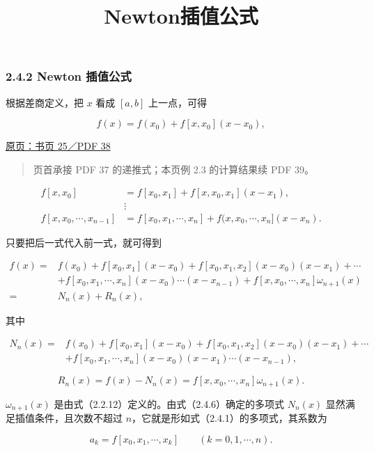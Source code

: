 \documentclass[
  10pt,
  fontset=fandol]{ctexart}
\title{Newton插值公式}
\author{}
\date{}
\begin{document}
\maketitle

\subsubsection{2.4.2 Newton 插值公式}\label{newton-ux63d2ux503cux516cux5f0f}

根据差商定义，把 \(x\) 看成 \([a,b]\) 上一点，可得

\[
f(x)=f(x_0)+f[x,x_0](x-x_0),
\]

\href{../../source-images/pdf-038.jpeg}{原页：书页 25／PDF 38}

\begin{quote}
页首承接 PDF 37 的递推式；本页例 2.3 的计算结果续 PDF 39。
\end{quote}

\[
\begin{aligned}
f[x,x_0]&=f[x_0,x_1]+f[x,x_0,x_1](x-x_1),\\
&\vdots\\
f[x,x_0,\cdots,x_{n-1}]&=f[x_0,x_1,\cdots,x_n]+f(x,x_0,\cdots,x_n](x-x_n).
\end{aligned}
\]

只要把后一式代入前一式，就可得到

\[
\begin{aligned}
f(x)={}&f(x_0)+f[x_0,x_1](x-x_0)+f[x_0,x_1,x_2](x-x_0)(x-x_1)+\cdots\\
&+f[x_0,x_1,\cdots,x_n](x-x_0)\cdots(x-x_{n-1})+f[x,x_0,\cdots,x_n]\omega_{n+1}(x)\\
={}&N_n(x)+R_n(x),
\end{aligned}
\]

其中

\[
\begin{aligned}
N_n(x)={}&f(x_0)+f[x_0,x_1](x-x_0)+f[x_0,x_1,x_2](x-x_0)(x-x_1)+\cdots\\
&+f[x_0,x_1,\cdots,x_n](x-x_0)(x-x_1)\cdots(x-x_{n-1}),
\end{aligned}
\tag{2.4.6}
\]

\[
R_n(x)=f(x)-N_n(x)=f[x,x_0,\cdots,x_n]\omega_{n+1}(x).
\tag{2.4.7}
\]

\(\omega_{n+1}(x)\) 是由式（2.2.12）定义的。由式（2.4.6）确定的多项式 \(N_n(x)\) 显然满足插值条件，且次数不超过 \(n\)，它就是形如式（2.4.1）的多项式，其系数为

\[
a_k=f[x_0,x_1,\cdots,x_k]\qquad(k=0,1,\cdots,n).
\]
\end{document}
